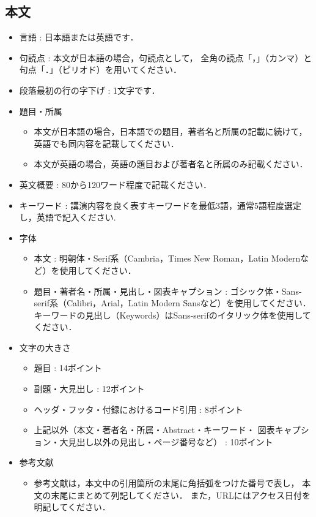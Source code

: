 \documentclass{ltjoc}
\begin{document}
\subsection{本文}
\begin{itemize}
\item 言語 : 日本語または英語です．
\item 句読点 : 本文が日本語の場合，句読点として，
  全角の読点「，」（カンマ）と句点「．」（ピリオド）を用いてください． 
\item 段落最初の行の字下げ : 1文字です．
\item 題目・所属
  \begin{itemize}
  \item 
    本文が日本語の場合，日本語での題目，著者名と所属の記載に続けて，
    英語でも同内容を記載してください．
  \item 
    本文が英語の場合，英語の題目および著者名と所属のみ記載ください．
  \end{itemize}
\item 英文概要 : 80から120ワード程度で記載ください．
\item キーワード : 講演内容を良く表すキーワードを最低3語，通常5語程度選定し，英語で記入ください.
\item 字体
  \begin{itemize}
  \item 本文 :
    明朝体・Serif系（Cambria，Times New Roman，Latin Modernなど）を使用してください．
  \item 題目・著者名・所属・見出し・図表キャプション : 
    ゴシック体・Sans-serif系（Calibri，Arial，Latin Modern Sansなど）を使用してください．
    キーワードの見出し（Keywords）はSans-serifのイタリック体を使用してください．
  \end{itemize}
\item 文字の大きさ
  \begin{itemize}
  \item 題目 : 14ポイント
  \item 副題・大見出し : 12ポイント
  \item ヘッダ・フッタ・付録におけるコード引用 : 8ポイント
  \item 上記以外（本文・著者名・所属・Abstract・キーワード・
      図表キャプション・大見出し以外の見出し・ページ番号など） : 10ポイント
  \end{itemize}
\item 参考文献
  \begin{itemize}
  \item 
  参考文献は，本文中の引用箇所の末尾に角括弧をつけた番号で表し，
  本文の末尾にまとめて列記してください\cite{Nishi:OpenCAE2018-001,BB21459576}．
  また，URLにはアクセス日付を明記してください\cite{SIST02-200}．
  \end{itemize}
\end{itemize}
\end{document}
